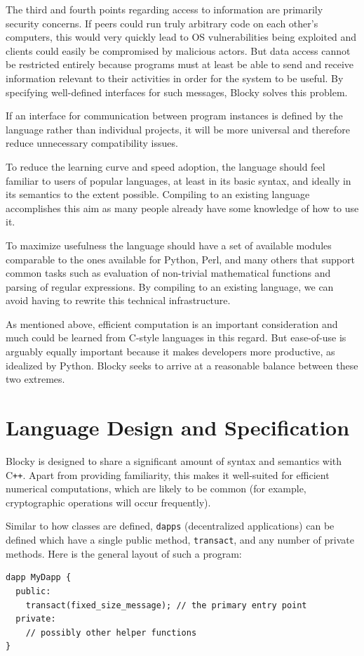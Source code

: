 \documentclass[letterpaper]{article}
\begin{document}
The third and fourth points regarding access to information are primarily security concerns. If peers could run truly arbitrary code on each other's computers, this would very quickly lead to OS vulnerabilities being exploited and clients could easily be compromised by malicious actors. But data access cannot be restricted entirely because programs must at least be able to send and receive information relevant to their activities in order for the system to be useful. By specifying well-defined interfaces for such messages, Blocky solves this problem.

If an interface for communication between program instances is defined by the language rather than individual projects, it will be more universal and therefore reduce unnecessary compatibility issues.

To reduce the learning curve and speed adoption, the language should feel familiar to users of popular languages, at least in its basic syntax, and ideally in its semantics to the extent possible. Compiling to an existing language accomplishes this aim as many people already have some knowledge of how to use it.

To maximize usefulness the language should have a set of available modules comparable to the ones available for Python, Perl, and many others that support common tasks such as evaluation of non-trivial mathematical functions and parsing of regular expressions. By compiling to an existing language, we can avoid having to rewrite this technical infrastructure.

As mentioned above, efficient computation is an important consideration and much could be learned from C-style languages in this regard. But ease-of-use is arguably equally important because it makes developers more productive, as idealized by Python. Blocky seeks to arrive at a reasonable balance between these two extremes.

\section{Language Design and Specification}

Blocky is designed to share a significant amount of syntax and semantics with C\texttt{++}. Apart from providing familiarity, this makes it well-suited for efficient numerical computations, which are likely to be common (for example, cryptographic operations will occur frequently).

Similar to how classes are defined, \texttt{dapps} (decentralized applications) can be defined which have a single public method, \texttt{transact}, and any number of private methods. Here is the general layout of such a program:
\begin{lstlisting}
dapp MyDapp {
  public:
    transact(fixed_size_message); // the primary entry point
  private:
    // possibly other helper functions
}
\end{lstlisting}
\end{document}
